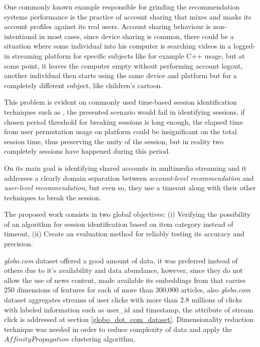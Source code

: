 \documentclass[ecp,tc,english]{iiufrgs}
\begin{document}
One commonly known example responsible for grinding the recommendation systems performance is the practice of account sharing that mixes and masks its account profiles against its real users. Account sharing behaviour is non-intentional in most cases, since device sharing is common, there could be a situation where some individual into his computer is searching videos in a logged-in streaming platform for specific subjects like for example C++ usage, but at some point, it leaves the computer empty without performing account logout, another individual then starts using the same device and platform but for a completely different subject, like children's cartoon.

This problem is evident on commonly used time-based session identification techniques such as \cite{halfaker2015}, the presented scenario would fail in identifying sessions, if chosen period threshold for breaking sessions is long enough, the elapsed time from user permutation usage on platform could be insignificant on the total session time, thus preserving the unity of the session, but in reality two completely sessions have happened during this period.

On \cite{jiang2018} its main goal is identifying shared accounts in multimedia streaming and it addresses a clearly domain separation between \textit{account-level recommendation} and \textit{user-level recommendation}, but even so, they use a timeout along with their other techniques to break the session.

The proposed work consists in two global objectives: (i) Verifying the possibility of an algorithm for session identification based on item category instead of timeout, 
(ii) Create an evaluation method for reliably testing its accuracy and precision.

\textit{globo.com} dataset offered a good amount of data, it was preferred instead of others due to it's availability and data abundance, however, since they do not allow the use of news content, \cite{moreira2018chameleon} made available its embeddings from that carries 250 dimensions of features for each of more than 300,000 articles, also \textit{globo.com} dataset aggregates streams of user clicks with more than 2.8 millions of clicks with labeled information such as user\_id and timestamp, the attribute of stream click is addressed at section \ref{globo_dot_com_dataset}.
Dimensionality reduction technique was needed in order to reduce complexity of data and apply the \(Affinity Propagation\) clustering algorithm,
\end{document}
